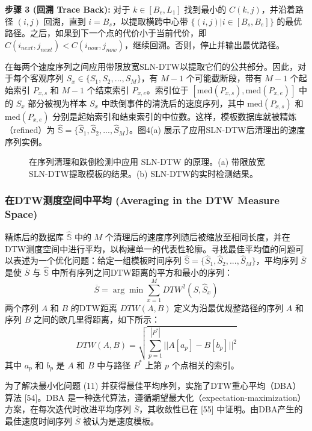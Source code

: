 \documentclass[journal]{IEEEtran}
\begin{document}
\textbf{步骤 3 (回溯 Trace Back):}
对于 $k \in [B_{e}, L_{1}]$ 找到最小的 $C(k,j)$，并沿着路径 $(i,j)$ 回溯，直到 $i=B_{s}$，以提取横跨中心带 $\{(i,j) | i \in [B_{s}, B_{e}]\}$ 的最优路径。之后，如果到下一个点的代价小于当前代价，即 $C(i_{next}, j_{next}) < C(i_{now}, j_{now})$，继续回溯。否则，停止并输出最优路径。

在每两个速度序列之间应用带限放宽SLN-DTW以提取它们的公共部分。因此，对于每个客观序列 $S_{x} \in \{S_{1}, S_{2}, ..., S_{M}\}$，有 $M-1$ 个可能截断段，带有 $M-1$ 个起始索引 $P_{x,s}$ 和 $M-1$ 个结束索引 $P_{x,e}$。索引位于 $[\text{med}(P_{x,s}), \text{med}(P_{x,e})]$ 中的 $S_{x}$ 部分被视为样本 $S_{x}$ 中跌倒事件的清洗后的速度序列，其中 $\text{med}(P_{x,s})$ 和 $\text{med}(P_{x,e})$ 分别是起始索引和结束索引的中位数。这样，模板数据库就被精炼（refined）为 $\hat{\mathbb{S}} = \{\hat{S}_{1}, \hat{S}_{2}, ..., \hat{S}_{M}\}$。图4(a) 展示了应用SLN-DTW后清理出的速度序列实例。

\begin{figure}[htbp]
\centering
\vspace{4cm} %
\caption{在序列清理和跌倒检测中应用 SLN-DTW 的原理。(a) 带限放宽SLN-DTW提取模板的结果。(b) SLN-DTW的实时检测结果。}
\end{figure}

\subsubsection{在DTW测度空间中平均 (Averaging in the DTW Measure Space)}
精炼后的数据库 $\hat{\mathbb{S}}$ 中的 $M$ 个清理后的速度序列随后被缩放至相同长度，并在DTW测度空间中进行平均，以构建单一的代表性轮廓。寻找最佳平均值的问题可以表述为一个优化问题：给定一组模板时间序列 $\hat{\mathbb{S}} = \{\hat{S}_{1}, \hat{S}_{2}, ..., \hat{S}_{M}\}$，平均序列 $\overline{S}$ 是使 $\overline{S}$ 与 $\hat{\mathbb{S}}$ 中所有序列之间DTW距离的平方和最小的序列：
\begin{equation}
\overline{S} = \arg \min \sum_{x=1}^{M} DTW^{2}(S, \hat{S}_{x})
\end{equation}
两个序列 $A$ 和 $B$ 的DTW距离 $DTW(A,B)$ 定义为沿最优规整路径的序列 $A$ 和序列 $B$ 之间的欧几里得距离，如下所示：
\begin{equation}
DTW(A,B) = \sqrt{\sum_{p=1}^{|P^{*}|} ||A[a_{p}]-B[b_{p}]||^{2}}
\end{equation}
其中 $a_p$ 和 $b_p$ 是 $A$ 和 $B$ 中与路径 $P^*$ 上第 $p$ 个点相关的索引。

为了解决最小化问题 (11) 并获得最佳平均序列，实施了DTW重心平均（DBA）算法 [54]。DBA 是一种迭代算法，遵循期望最大化（expectation-maximization）方案，在每次迭代时改进平均序列 $\overline{S}$，其收敛性已在 [55] 中证明。由DBA产生的最佳速度时间序列 $\overline{S}$ 被认为是速度模板。
\end{document}
